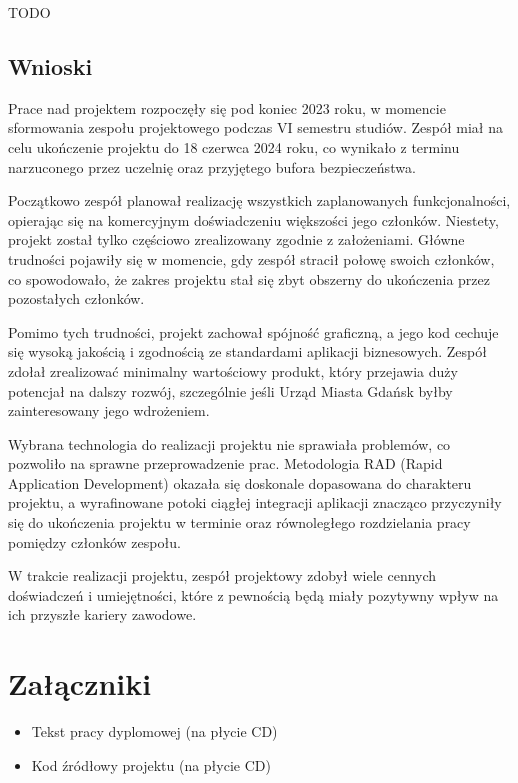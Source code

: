 TODO

\section{Wnioski}\label{sec:wnioski}
Prace nad projektem rozpoczęły się pod koniec 2023 roku, w momencie sformowania zespołu projektowego podczas VI semestru studiów.
Zespół miał na celu ukończenie projektu do 18 czerwca 2024 roku, co wynikało z terminu narzuconego przez uczelnię oraz przyjętego bufora bezpieczeństwa.

Początkowo zespół planował realizację wszystkich zaplanowanych funkcjonalności, opierając się na komercyjnym doświadczeniu większości jego członków.
Niestety, projekt został tylko częściowo zrealizowany zgodnie z założeniami.
Główne trudności pojawiły się w momencie, gdy zespół stracił połowę swoich członków, co spowodowało, że zakres projektu stał się zbyt obszerny do ukończenia przez pozostałych członków.

Pomimo tych trudności, projekt zachował spójność graficzną, a jego kod cechuje się wysoką jakością i zgodnością ze standardami aplikacji biznesowych.
Zespół zdołał zrealizować minimalny wartościowy produkt, który przejawia duży potencjał na dalszy rozwój, szczególnie jeśli Urząd Miasta Gdańsk byłby zainteresowany jego wdrożeniem.

Wybrana technologia do realizacji projektu nie sprawiała problemów, co pozwoliło na sprawne przeprowadzenie prac.
Metodologia RAD (Rapid Application Development) okazała się doskonale dopasowana do charakteru projektu, a wyrafinowane potoki ciągłej integracji aplikacji znacząco przyczyniły się do ukończenia projektu w terminie oraz równoległego rozdzielania pracy pomiędzy członków zespołu.

W trakcie realizacji projektu, zespół projektowy zdobył wiele cennych doświadczeń i umiejętności, które z pewnością będą miały pozytywny wpływ na ich przyszłe kariery zawodowe.

\chapter*{Załączniki}
\begin{itemize}
    \item Tekst pracy dyplomowej (na płycie CD)
    \item Kod źródłowy projektu (na płycie CD)
\end{itemize}
